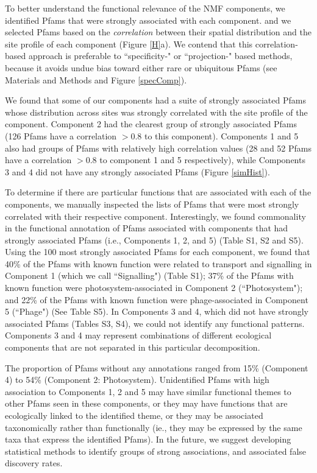 To better understand the functional relevance of the NMF components, we identified Pfams that were strongly associated with each component.   and we selected Pfams based on the \emph{correlation} between their spatial distribution and the site profile of each component (Figure \ref{H}a).  We contend that this correlation-based approach is preferable to ``specificity-" \cite{jiang_non-negative_2012} or ``projection-" \cite{carmona2006biclustering, kim_sparse_2007} based methods, because it avoids undue bias toward either rare or ubiquitous Pfams (see Materials and Methods and Figure \ref{specComp}).

We found that some of our components had a suite of strongly associated Pfams whose distribution across sites was strongly correlated with the site profile of the component. Component 2 had the clearest group of strongly associated Pfams (126 Pfams have a correlation $> 0.8$ to this component).  Components 1 and 5 also had groups of Pfams with relatively high correlation values (28 and 52 Pfams have a correlation $> 0.8$ to component 1 and 5 respectively), while Components 3 and 4 did not have any strongly associated Pfams (Figure \ref{simHist}). 

To determine if there are particular functions that are associated with each of the components, we manually inspected the lists of Pfams that were most strongly correlated with their respective component. Interestingly, we found commonality in the functional annotation of Pfams associated with components that had strongly associated Pfams (i.e., Components 1, 2, and 5) (Table S1, S2 and S5). Using the 100 most strongly associated Pfams for each component, we found that 40\% of the Pfams with known function were related to transport and signalling in Component 1 (which we call ``Signalling") (Table S1); 37\% of the Pfams with known function were photosystem-associated in Component 2 (``Photosystem"); and 22\% of the Pfams with known function were phage-associated in Component 5 (``Phage") (See Table S5). In Components 3 and 4, which did not have strongly associated Pfams (Tables S3, S4), we could not identify any functional patterns.  Components 3 and 4 may represent combinations of different ecological components that are not separated in this particular decomposition. 

The proportion of Pfams without any annotations ranged from 15\% (Component 4) to 54\% (Component 2: Photosystem). Unidentified Pfams with high association to Components 1, 2 and 5 may have similar functional themes to other Pfams seen in these components, or they may have functions that are ecologically linked to the identified theme, or they may be associated taxonomically rather than functionally (ie., they may be expressed by the same taxa that express the identified Pfams).  In the future, we suggest developing statistical methods to identify groups of strong associations, and associated false discovery rates.

